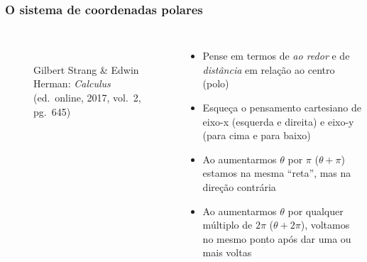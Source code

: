 \documentclass[pdftex, brazil, aspectratio=169]{beamer}
\begin{document}
\begin{frame}[t]
  \frametitle{O sistema de coordenadas polares}
  \begin{columns}
    \centering
    \begin{figure}[H]
      \begin{center}
        \label{fig:int2-16}
        \\
        \footnotesize{Gilbert Strang \& Edwin Herman: \emph{Calculus}
          (ed.\ online, 2017, vol.\ 2, pg.\ 645)}
      \end{center}
    \end{figure}
    \begin{itemize}
      \item Pense em termos de \emph{ao redor} e de \emph{distância}
            em relação ao centro (polo)
      \item Esqueça o pensamento cartesiano de eixo-x (esquerda e
            direita) e eixo-y (para cima e para baixo)
      \item Ao aumentarmos $\theta$ por $\pi$ ($\theta +
        \pi$) estamos na mesma ``reta'', mas na direção contrária
      \item Ao aumentarmos $\theta$ por qualquer múltiplo de
            $2\pi$ ($\theta + 2\pi$), voltamos no mesmo ponto após dar
            uma ou mais voltas
    \end{itemize}
  \end{columns}
\end{frame}
\end{document}
